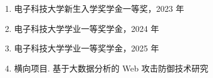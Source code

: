 \documentclass[master, vlined]{DissertUESTC}
\begin{document}



	
	\achievement %
	
	\begin{enumerate}
		\item 电子科技大学新生入学奖学金一等奖，2023 年
		\item 电子科技大学学业一等奖学金，2024 年
		\item 电子科技大学学业一等奖学金，2025 年
		\item 横向项目. 基于大数据分析的 Web 攻击防御技术研究
	    
	\end{enumerate}
	
	\newpage%
	
		
		
	
	
\end{document}
